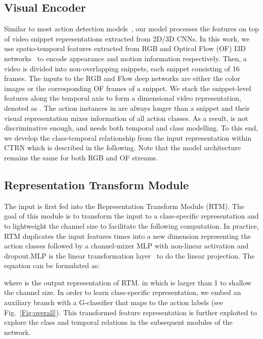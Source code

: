 \documentclass{bmvc2k}
\begin{document}
\subsection{Visual Encoder}
Similar to most action detection models~\cite{lea2017temporal,superevent,TGM1}, our model processes the features on top of video snippet representations extracted from 2D/3D CNNs. In this work, we use spatio-temporal features extracted from RGB and Optical Flow (OF) I3D networks~\cite{i3d} to encode appearance and motion information respectively. Then, a video is divided into  non-overlapping snippets, each snippet consisting of 16 frames. The inputs to the RGB and Flow deep networks are either the color images or the corresponding OF frames of a snippet. 
We stack the snippet-level features along the temporal axis to form a  dimensional video representation, denoted as . 
The action instances in  are always longer than a snippet and their visual representation mixes information of all action classes. As a result,  is not discriminative enough, and needs both temporal and class modelling. {To this end, we develop the class-temporal relationship from the input representation  within CTRN which is described in the following.
Note that the model architecture remains the same for both RGB and OF streams.} 



\subsection{Representation Transform Module} 
The input  is first fed into the Representation Transform Module (RTM). The goal of this module is to transform the input to a class-specific representation and to lightweight the channel size to facilitate the following computation.
In practice, RTM duplicates the input features  times into a new dimension representing the action classes followed by a channel-mixer MLP with non-linear activation and dropout.MLP is the linear transformation layer~\cite{almeida1997c1} to do the linear projection.
The equation can be formulated as:

\vspace{-2mm}

where  is the output representation of RTM.  in which  is larger than 1 to shallow the channel size.  
 In order to learn class-specific representation, we embed an auxiliary branch with a G-classifier that maps  to the action labels (see Fig.~\ref{Fig:overall}).
This transformed feature representation is further exploited to explore the class and temporal relations in the subsequent modules of the network. 
\end{document}

